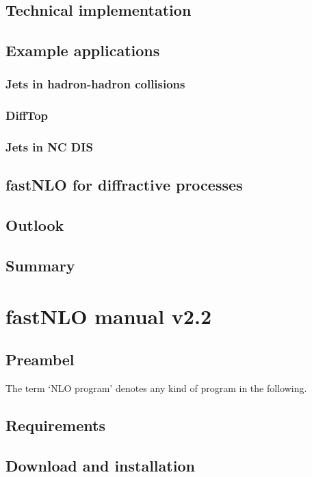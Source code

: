 \documentclass[a4paper,11pt]{article}
\begin{document}
\subsection{Technical implementation}

\subsection{Example applications}

\subsubsection{Jets in hadron-hadron collisions}

\subsubsection{DiffTop}

\subsubsection{Jets in NC DIS}

\subsection{fastNLO for diffractive processes}

\subsection{Outlook}

\subsection{Summary}


\clearpage
\section{fastNLO manual v2.2}
\subsection{Preambel}
The term `NLO program' denotes any kind of program in the following.

\subsection{Requirements}

\subsection{Download and installation}
\end{document}
